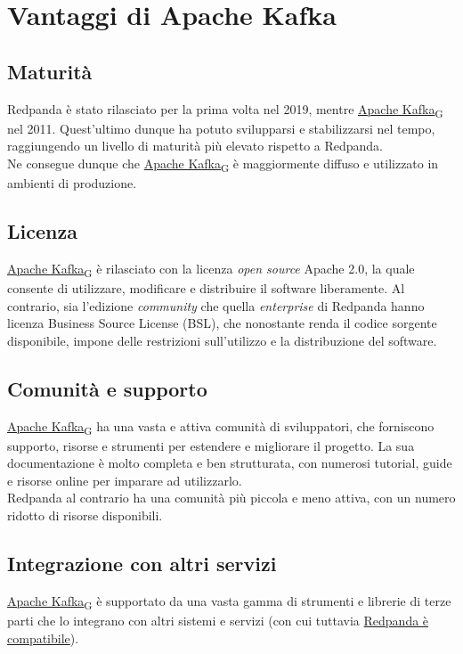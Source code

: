 \section{Vantaggi di Apache Kafka}
\subsection{Maturità}
Redpanda è stato rilasciato per la prima volta nel 2019, mentre \href{https://7last.github.io/docs/rtb/documentazione-interna/glossario\#apache-kafka}{Apache Kafka\textsubscript{G}} nel 2011.
Quest'ultimo dunque ha potuto svilupparsi e stabilizzarsi nel tempo, raggiungendo
un livello di maturità più elevato rispetto a Redpanda.\\
Ne consegue dunque che \href{https://7last.github.io/docs/rtb/documentazione-interna/glossario\#apache-kafka}{Apache Kafka\textsubscript{G}} è maggiormente diffuso e utilizzato in ambienti di
produzione.

\subsection{Licenza}
\href{https://7last.github.io/docs/rtb/documentazione-interna/glossario\#apache-kafka}{Apache Kafka\textsubscript{G}} è rilasciato con la licenza \textit{open source} Apache 2.0, la quale consente di utilizzare, modificare e distribuire il software liberamente.
Al contrario, sia l'edizione \textit{community} che quella \textit{enterprise} di Redpanda hanno licenza Business Source License (BSL), che
nonostante renda il codice sorgente disponibile, impone delle restrizioni sull'utilizzo e la distribuzione del software.


\subsection{Comunità e supporto}
\href{https://7last.github.io/docs/rtb/documentazione-interna/glossario\#apache-kafka}{Apache Kafka\textsubscript{G}} ha una vasta e attiva comunità di sviluppatori, che forniscono supporto, risorse e strumenti per estendere e migliorare il progetto.
La sua documentazione è molto completa e ben strutturata, con numerosi tutorial, guide e risorse online per imparare ad utilizzarlo.\\
Redpanda al contrario ha una comunità più piccola e meno attiva, con un numero ridotto di risorse disponibili.

\subsection{Integrazione con altri servizi}
\href{https://7last.github.io/docs/rtb/documentazione-interna/glossario\#apache-kafka}{Apache Kafka\textsubscript{G}} è supportato da una vasta gamma di strumenti e librerie di terze parti che lo integrano con altri sistemi e servizi
(con cui tuttavia \href{https://docs.redpanda.com/current/develop/kafka-clients/}{Redpanda è compatibile}).

